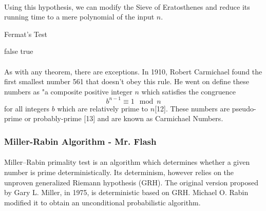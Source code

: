 \documentclass[paper=a4, fontsize=11pt]{scrartcl}	%
\numberwithin{equation}{section}		%
\numberwithin{figure}{section}		%
\numberwithin{table}{section}		%
\begin{document}
\paragraph{}Using this hypothesis, we can modify the Sieve of Eratosthenes and reduce its running time to a mere polynomial of the input $n$.
\begin{algorithm}
\caption{Fermat's Test}
\label{alg2}
\begin{algorithmic}[1]
\RETURN false
\ENDIF
\ENDFOR
\RETURN true
\end{algorithmic}
\end{algorithm}

\paragraph{}As with any theorem, there are exceptions. In 1910, Robert Carmichael found the first smallest number 561 that doesn't obey this rule. He went on define these numbers as "a composite positive integer $n$ which satisfies the congruence
\[b^{n-1} \equiv 1 \mod n\]
for all integers $b$ which are relatively prime to $n$[12]. These numbers are pseudo-prime or probably-prime [13] and are known as Carmichael Numbers. 

\subsubsection{Miller-Rabin Algorithm - Mr. Flash}
\paragraph{}Miller--Rabin primality test is an algorithm which determines whether a given number is prime deterministically. Its determinism, however relies on the unproven generalized Riemann hypothesis (GRH). The original version proposed by Gary L. Miller, in 1975, is  deterministic based on GRH. Michael O. Rabin modified it to obtain an unconditional probabilistic algorithm.
\end{document}

